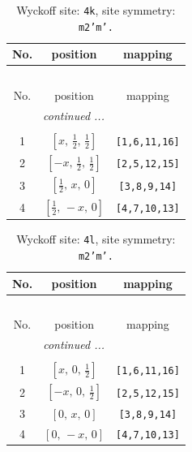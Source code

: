 \documentclass[fleqn,8pt]{jsarticle}
\begin{document}
\renewcommand{\arraystretch}{1.2}
\begin{longtable}{ccc}
\caption{Wyckoff site: {\tt 4k}, site symmetry: {\tt m2'm'.}}
 \\
 \hline \hline
No. & position & mapping \\ \hline \endfirsthead

\multicolumn{2}{l}{\tablename\ \thetable{}} \\
 \hline \hline
No. & position & mapping \\ \hline \endhead

 \hline \hline
\multicolumn{2}{r}{\footnotesize\it continued ...} \\ \endfoot

 \hline \hline
\multicolumn{2}{r}{} \\ \endlastfoot

1 & $\left[ x,\, \frac{1}{2},\, \frac{1}{2} \right]$ & {\tt [1,6,11,16]} \\ \hline
2 & $\left[ - x,\, \frac{1}{2},\, \frac{1}{2} \right]$ & {\tt [2,5,12,15]} \\ \hline
3 & $\left[ \frac{1}{2},\, x,\, 0 \right]$ & {\tt [3,8,9,14]} \\ \hline
4 & $\left[ \frac{1}{2},\, - x,\, 0 \right]$ & {\tt [4,7,10,13]} \\
\end{longtable}
\renewcommand{\arraystretch}{1.2}
\begin{longtable}{ccc}
\caption{Wyckoff site: {\tt 4l}, site symmetry: {\tt m2'm'.}}
 \\
 \hline \hline
No. & position & mapping \\ \hline \endfirsthead

\multicolumn{2}{l}{\tablename\ \thetable{}} \\
 \hline \hline
No. & position & mapping \\ \hline \endhead

 \hline \hline
\multicolumn{2}{r}{\footnotesize\it continued ...} \\ \endfoot

 \hline \hline
\multicolumn{2}{r}{} \\ \endlastfoot

1 & $\left[ x,\, 0,\, \frac{1}{2} \right]$ & {\tt [1,6,11,16]} \\ \hline
2 & $\left[ - x,\, 0,\, \frac{1}{2} \right]$ & {\tt [2,5,12,15]} \\ \hline
3 & $\left[ 0,\, x,\, 0 \right]$ & {\tt [3,8,9,14]} \\ \hline
4 & $\left[ 0,\, - x,\, 0 \right]$ & {\tt [4,7,10,13]} \\
\end{longtable}
\end{document}
